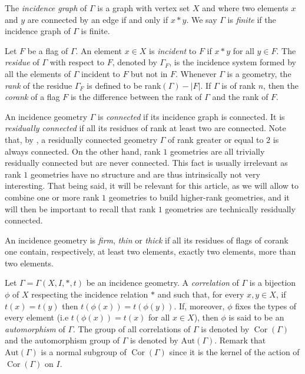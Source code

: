 \documentclass[11pt,letterpaper]{amsart}
\DeclareMathOperator{\Cor}{Cor}
\newcommand{\Aut}{\mathrm{Aut}}
\begin{document}
The \textit{incidence graph} of $\Gamma$ is a graph with vertex set $X$ and where two elements $x$ and $y$ are connected by an edge if and only if $x * y$.
We say $\Gamma$ is \textit{finite} if the incidence graph of $\Gamma$ is finite.

Let $F$ be a flag of $\Gamma$. An element $x\in X$ is {\em incident} to $F$ if $x*y$ for all $y\in F$. The \textit{residue} of $\Gamma$ with respect to $F$, denoted by $\Gamma_F$, is the incidence system formed by all the elements of $\Gamma$ incident to $F$ but not in $F$. Whenever $\Gamma$ is a geometry, the \textit{rank} of the residue $\Gamma_F$ is defined to be rank$(\Gamma) - |F|$. If $\Gamma$ is of rank $n$, then the \textit{corank} of a flag $F$ is the difference between the rank of $\Gamma$ and the rank of $F$.

An incidence geometry $\Gamma$ is \textit{connected} if its incidence graph is connected. It is \textit{residually connected} if all its residues of rank at least two are connected. Note that, by \cite[Lemma 1.6.3]{buekenhout2013diagram}, a residually connected geometry $\Gamma$ of rank greater or equal to $2$ is always connected. On the other hand, rank $1$ geometries are all trivially residually connected but are never connected. This fact is usually irrelevant as rank $1$ geometries have no structure and are thus intrinsically not very interesting. That being said, it will be relevant for this article, as we will allow to combine one or more rank $1$ geometries to build higher-rank geometries, and it will then be important to recall that rank $1$ geometries are technically residually connected.

An incidence geometry is \textit{firm}, \textit{thin} or \textit{thick} if all its residues of flags of corank one contain, respectively, at least two elements,  exactly two elements, more than two elements.

Let $\Gamma = \Gamma(X,I,*,t)$ be an incidence geometry. A {\em correlation} of $\Gamma$ is a bijection $\phi$ of $X$ respecting the incidence relation $*$ and such that, for every $x,y \in X$, if $t(x) = t(y)$ then $t(\phi(x)) = t(\phi(y))$. If, moreover, $\phi$ fixes the types of every element (i.e $t(\phi(x)) = t(x)$ for all $x \in X$), then $\phi$ is said to be an {\em automorphism} of $\Gamma$. The group of all correlations of $\Gamma$ is denoted by $\Cor(\Gamma)$ and the automorphism group of $\Gamma$ is denoted by $\Aut(\Gamma)$. Remark that $\Aut(\Gamma)$ is a normal subgroup of $\Cor(\Gamma)$ since it is the kernel of the action of $\Cor(\Gamma)$ on $I$.
\end{document}

